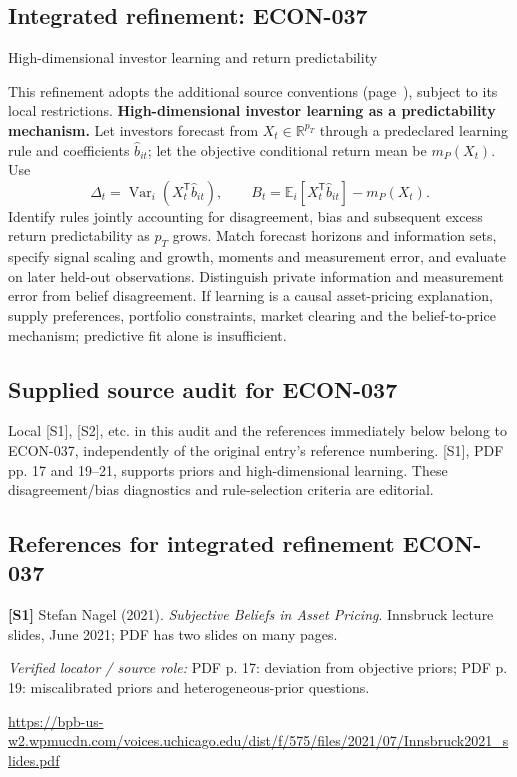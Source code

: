 \documentclass[11pt,a4paper]{article}
\begin{document}
\subsection*{Integrated refinement: ECON-037}
{\sffamily\small\color{muted}High-dimensional investor learning and return predictability\par}
This refinement adopts the additional source conventions
(page~\pageref{audited:conventions}), subject to its local restrictions.
\textbf{High-dimensional investor learning as a predictability mechanism.}
Let investors forecast from $X_t\in\mathbb R^{p_T}$ through a predeclared learning
rule and coefficients $\widehat b_{it}$; let the objective conditional return mean
be $m_P(X_t)$. Use
\[
\Delta_t=\operatorname{Var}_i(X_t^{\mathsf T}\widehat b_{it}),\qquad
B_t=\mathbb E_i[X_t^{\mathsf T}\widehat b_{it}]-m_P(X_t).
\]
Identify rules jointly accounting for disagreement, bias and subsequent excess
return predictability as $p_T$ grows. Match forecast horizons and information
sets, specify signal scaling and growth, moments and measurement error, and
evaluate on later held-out observations. Distinguish private information and
measurement error from belief disagreement. If learning is a causal asset-pricing
explanation, supply preferences, portfolio constraints, market clearing and the
belief-to-price mechanism; predictive fit alone is insufficient.
\subsection*{Supplied source audit for ECON-037}
Local [S1], [S2], etc. in this audit and the references immediately below
belong to ECON-037, independently of the original entry's reference numbering.
[S1], PDF pp. 17 and 19--21, supports priors and high-dimensional learning. These disagreement/bias diagnostics and rule-selection criteria are editorial.
\subsection*{References for integrated refinement ECON-037}
{\footnotesize\raggedright
\par\noindent\textbf{[S1]} Stefan Nagel (2021). \emph{Subjective Beliefs in Asset Pricing}. Innsbruck lecture slides, June 2021; PDF has two slides on many pages.\par \textit{Verified locator / source role:} PDF p. 17: deviation from objective priors; PDF p. 19: miscalibrated priors and heterogeneous-prior questions.\par \url{https://bpb-us-w2.wpmucdn.com/voices.uchicago.edu/dist/f/575/files/2021/07/Innsbruck2021_slides.pdf}\par\smallskip
}
\end{document}
